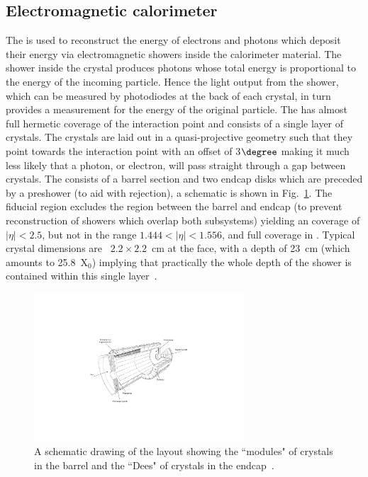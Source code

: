 \subsection{Electromagnetic calorimeter}
\label{sec:ecal}
The \ECAL is used to reconstruct the energy of electrons and photons which deposit their energy via electromagnetic showers inside the calorimeter material. The shower inside the crystal produces photons whose total energy is proportional to the energy of the incoming particle. Hence the light output from the shower, which can be measured by photodiodes at the back of each crystal, in turn provides a measurement for the energy of the original particle. The \ECAL has almost full hermetic coverage of the interaction point and consists of a single layer of \PbWO crystals. The crystals are laid out in a quasi-projective geometry such that they point towards the interaction point with an offset of 3$\degree$ making it much less likely that a photon, or electron, will pass straight through a gap between crystals. The \ECAL consists of a barrel section and two endcap disks which are preceded by a preshower (to aid with \pizero rejection), a schematic is shown in Fig.~\ref{fig:cms_ecal}. The fiducial region excludes the region between the barrel and endcap (to prevent reconstruction of showers which overlap both subsystems) yielding an \ECAL coverage of $|\eta|<2.5$, but not in the range $1.444<|\eta|<1.556$, and full coverage in \phi. Typical crystal dimensions are ~$2.2\times 2.2$~cm at the \ECAL face, with a depth of 23~cm (which amounts to 25.8~X$_{0}$) implying that practically the whole depth of the shower is contained within this single layer~\cite{ecal_project}. 
\begin{figure}
  \includegraphics[width=0.7\textwidth]{cms_experiment/plots/cmsecal.pdf}
  \caption[\acs{CMS} \acs{ECAL} schematic]{A schematic drawing of the \CMS \ECAL layout showing the ``modules" of crystals in the \ECAL barrel and the ``Dees" of crystals in the \ECAL endcap~\cite{CMS_JINST}.}
  \label{fig:cms_ecal}
\end{figure}

